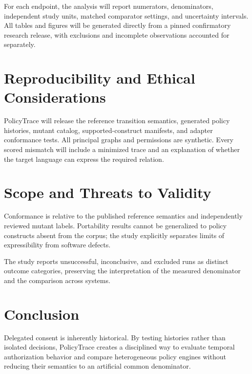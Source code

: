 \documentclass[11pt,a4paper]{article}
\begin{document}
For each endpoint, the analysis will report numerators, denominators, independent study units, matched comparator settings, and uncertainty intervals. All tables and figures will be generated directly from a pinned confirmatory research release, with exclusions and incomplete observations accounted for separately.

\section{Reproducibility and Ethical Considerations}
PolicyTrace will release the reference transition semantics, generated policy histories, mutant catalog, supported-construct manifests, and adapter conformance tests. All principal graphs and permissions are synthetic. Every scored mismatch will include a minimized trace and an explanation of whether the target language can express the required relation.

\section{Scope and Threats to Validity}
Conformance is relative to the published reference semantics and independently reviewed mutant labels. Portability results cannot be generalized to policy constructs absent from the corpus; the study explicitly separates limits of expressibility from software defects.

The study reports unsuccessful, inconclusive, and excluded runs as distinct outcome categories, preserving the interpretation of the measured denominator and the comparison across systems.

\section{Conclusion}
Delegated consent is inherently historical. By testing histories rather than isolated decisions, PolicyTrace creates a disciplined way to evaluate temporal authorization behavior and compare heterogeneous policy engines without reducing their semantics to an artificial common denominator.



\end{document}

